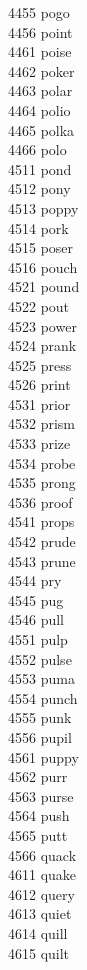4455 pogo \\
4456 point \\
4461 poise \\
4462 poker \\
4463 polar \\
4464 polio \\
4465 polka \\
4466 polo \\
4511 pond \\
4512 pony \\
4513 poppy \\
4514 pork \\
4515 poser \\
4516 pouch \\
4521 pound \\
4522 pout \\
4523 power \\
4524 prank \\
4525 press \\
4526 print \\
4531 prior \\
4532 prism \\
4533 prize \\
4534 probe \\
4535 prong \\
4536 proof \\
4541 props \\
4542 prude \\
4543 prune \\
4544 pry \\
4545 pug \\
4546 pull \\
4551 pulp \\
4552 pulse \\
4553 puma \\
4554 punch \\
4555 punk \\
4556 pupil \\
4561 puppy \\
4562 purr \\
4563 purse \\
4564 push \\
4565 putt \\
4566 quack \\
4611 quake \\
4612 query \\
4613 quiet \\
4614 quill \\
4615 quilt \\
